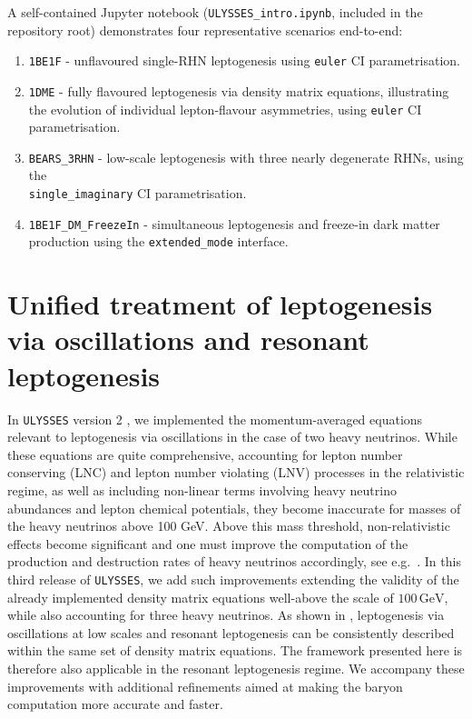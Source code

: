\documentclass[12pt, a4paper]{article}
\begin{document}
A self-contained Jupyter notebook (\texttt{ULYSSES\_intro.ipynb}, included in the repository root) demonstrates four representative scenarios end-to-end:
\begin{enumerate}
 \item \texttt{1BE1F} - unflavoured single-RHN leptogenesis using \texttt{euler} CI parametrisation.
 \item \texttt{1DME} - fully flavoured leptogenesis via density matrix equations, illustrating the evolution of individual lepton-flavour asymmetries, using \texttt{euler} CI parametrisation.
 \item \texttt{BEARS\_3RHN} - low-scale leptogenesis with three nearly degenerate RHNs, using the \\ \texttt{single\_imaginary} CI parametrisation.
 \item \texttt{1BE1F\_DM\_FreezeIn} - simultaneous leptogenesis and freeze-in dark matter production using the \texttt{extended\_mode} interface.
\end{enumerate}


\section{Unified treatment of leptogenesis via oscillations and resonant leptogenesis}
\label{sec:lowlep}
In \texttt{ULYSSES} version 2 \cite{Granelli:2023vcm}, we implemented the momentum-averaged equations relevant to leptogenesis via oscillations in the case of two heavy neutrinos. While these equations are quite comprehensive, accounting for lepton number conserving (LNC) and lepton number violating (LNV) processes in the relativistic regime, as well as including non-linear terms involving heavy neutrino abundances and lepton chemical potentials, they become inaccurate for masses of the heavy neutrinos above 100 GeV. Above this mass threshold, non-relativistic effects become significant and one must improve the computation of the production and destruction rates of heavy neutrinos accordingly, see e.g.~\cite{Klaric:2020phc, Klaric:2021cpi}. In this third release of \texttt{ULYSSES}, we add such improvements extending the validity of the already implemented density matrix equations well-above the scale of $100 \,\text{GeV}$, while also accounting for three heavy neutrinos. As shown in \cite{Klaric:2020phc, Klaric:2021cpi}, leptogenesis via oscillations at low scales and resonant leptogenesis can be consistently described within the same set of density matrix equations. The framework presented here is therefore also applicable in the resonant leptogenesis regime. We accompany these improvements with additional refinements aimed at making the baryon computation more accurate and faster.
\end{document}
